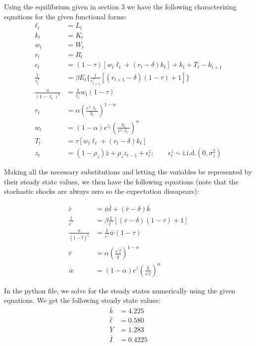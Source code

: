 \documentclass[letterpaper,11pt]{article}
\theoremstyle{definition}
\begin{document}
\begin{spacing}{1.5}
	\begin{Exercise} \label{DSGE_HW_CES}
		Using the equilibrium given in section 3 we have the following characterizing equations for the given functional forms:
		\begin{align*}
			\ell_t &= L_t \\
			k_t &= K_t \\
			w_t &= W_t \\
			r_t &= R_t \\
			c_t &= (1-\tau)[w_t\ell_t+(r_t-\delta)k_t]+k_t+T_t-k_{t+1} \\
			\frac{1}{c_t^\gamma} &=  \beta E_t \{\frac{1}{c_{t+1}^\gamma}[(r_{t+1}-\delta)(1-\tau)+1]\} \\
			\frac{a}{(1-\ell_t)^\xi} &= \frac{1}{c_t^\gamma} w_t(1-\tau) \\
			r_t&= \alpha (\frac{e^{z_t}\ell_t}{k_t})^{1-\alpha}\\
			w_t&= (1-\alpha)e^{z_t} (\frac{k_t}{e^{z_t}\ell_t})^{\alpha}\\
			T_t &= \tau[w_t\ell_t+(r_t-\delta)k_t] \\
			z_t &= (1-\rho_z)\bar{z}+\rho_zz_{t-1}+\epsilon_t^z; \qquad \epsilon_t^z \sim \text{i.i.d.}(0,\sigma_z^2)
		\end{align*}

		Making all the necessary substitutions and letting the variables be represented by their steady state values, we then have the following equations (note that the stochastic shocks are always zero so the expectation dissapears):

		\begin{align*}
			\bar{c} &= \bar{w}\bar{l}+(\bar{r}-\delta)\bar{k} \\
			\frac{1}{\bar{c}^\gamma} &=  \beta \frac{1}{\bar{c}^\gamma}[(\bar{r}-\delta)(1-\tau)+1] \\
			\frac{a}{(1-\bar{l})^\xi} &= \frac{1}{\bar{c}^\gamma} \bar{w}(1-\tau)\\
			\bar{r}&= \alpha (\frac{e^{\bar{z}}\bar{l}}{\bar{k}})^{1-\alpha}\\
			\bar{w}&= (1-\alpha)e^{\bar{z}} (\frac{\bar{k}}{e^{\bar{z}}\bar{l}})^{\alpha}
		\end{align*}

		In the python file, we solve for the steady states numerically using the given equations. We get the following steady state values:
		\begin{align*}
			\bar{k} &=  4.225\\
			\bar{\ell} &= 0.580 \\
			\bar{Y} &= 1.283\\
			\bar{I} &= 0.4225
		\end{align*}
	\end{Exercise}


\end{spacing}
\end{document}
